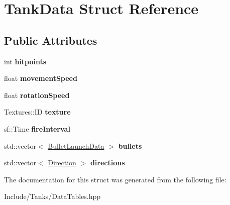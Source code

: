 \hypertarget{struct_tank_data}{}\section{Tank\+Data Struct Reference}
\label{struct_tank_data}
\subsection*{Public Attributes}
\begin{DoxyCompactItemize}
\item 
\hypertarget{struct_tank_data_a6a326cc7ca48f045ed8510c21e01113f}{}int {\bfseries hitpoints}\label{struct_tank_data_a6a326cc7ca48f045ed8510c21e01113f}

\item 
\hypertarget{struct_tank_data_a169d885b98acaf324159e7c711cd6d58}{}float {\bfseries movement\+Speed}\label{struct_tank_data_a169d885b98acaf324159e7c711cd6d58}

\item 
\hypertarget{struct_tank_data_a4492fd65aa4dcf33a8d284586cff1234}{}float {\bfseries rotation\+Speed}\label{struct_tank_data_a4492fd65aa4dcf33a8d284586cff1234}

\item 
\hypertarget{struct_tank_data_a421107fc22c25356c1a2ecd617149cf3}{}Textures\+::\+I\+D {\bfseries texture}\label{struct_tank_data_a421107fc22c25356c1a2ecd617149cf3}

\item 
\hypertarget{struct_tank_data_a3d6bbc5040160e731f9a4cd9fd0ab4a3}{}sf\+::\+Time {\bfseries fire\+Interval}\label{struct_tank_data_a3d6bbc5040160e731f9a4cd9fd0ab4a3}

\item 
\hypertarget{struct_tank_data_a987dcffc34a24fa25b6eacf154f9e5b2}{}std\+::vector$<$ \hyperlink{struct_bullet_launch_data}{Bullet\+Launch\+Data} $>$ {\bfseries bullets}\label{struct_tank_data_a987dcffc34a24fa25b6eacf154f9e5b2}

\item 
\hypertarget{struct_tank_data_a25b90870f56325d4284b254f9ebb6587}{}std\+::vector$<$ \hyperlink{struct_direction}{Direction} $>$ {\bfseries directions}\label{struct_tank_data_a25b90870f56325d4284b254f9ebb6587}

\end{DoxyCompactItemize}


The documentation for this struct was generated from the following file\+:\begin{DoxyCompactItemize}
\item 
Include/\+Tanks/Data\+Tables.\+hpp\end{DoxyCompactItemize}
